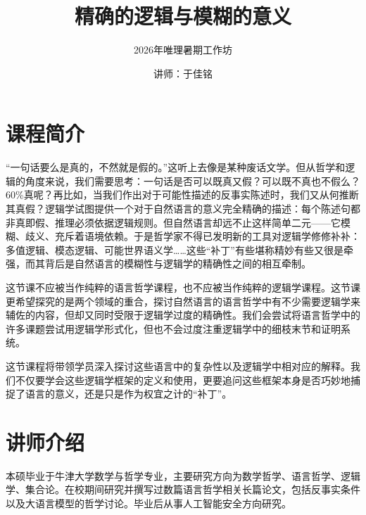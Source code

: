 \documentclass{article}
\title{\textbf{精确的逻辑与模糊的意义}}
\author{2026年唯理暑期⼯作坊}
\date{讲师：于佳铭}
\begin{document}
\maketitle

\section*{课程简介}

“一句话要么是真的，不然就是假的。”这听上去像是某种废话文学。但从哲学和逻辑的角度来说，我们需要思考：一句话是否可以既真又假？可以既不真也不假么？60\%真呢？再比如，当我们作出对于可能性描述的反事实陈述时，我们又从何推断其真假？逻辑学试图提供一个对于自然语言的意义完全精确的描述：每个陈述句都非真即假、推理必须依据逻辑规则。但自然语言却远不止这样简单二元——它模糊、歧义、充斥着语境依赖。于是哲学家不得已发明新的工具对逻辑学修修补补：多值逻辑、模态逻辑、可能世界语义学……这些“补丁”有些堪称精妙有些又很是牵强，而其背后是自然语言的模糊性与逻辑学的精确性之间的相互牵制。

这节课不应被当作纯粹的语言哲学课程，也不应被当作纯粹的逻辑学课程。这节课更希望探究的是两个领域的重合，探讨自然语言的语言哲学中有不少需要逻辑学来辅佐的内容，但却又同时受限于逻辑学过度的精确性。我们会尝试将语言哲学中的许多课题尝试用逻辑学形式化，但也不会过度注重逻辑学中的细枝末节和证明系统。

这节课程将带领学员深入探讨这些语言中的复杂性以及逻辑学中相对应的解释。我们不仅要学会这些逻辑学框架的定义和使用，更要追问这些框架本身是否巧妙地捕捉了语言的意义，还是只是作为权宜之计的“补丁”。


\section*{讲师介绍}

本硕毕业于牛津大学数学与哲学专业，主要研究方向为数学哲学、语言哲学、逻辑学、集合论。在校期间研究并撰写过数篇语言哲学相关长篇论文，包括反事实条件以及大语言模型的哲学讨论。毕业后从事人工智能安全方向研究。


%
\end{document}
